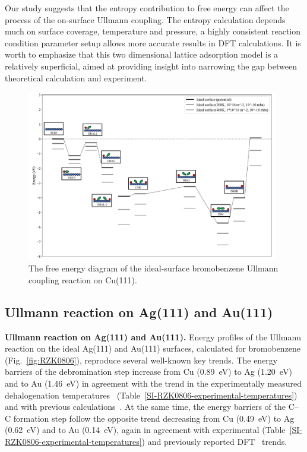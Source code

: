 \documentclass[journal=jacsat,manuscript=article]{achemso}
\begin{document}
{Our study suggests that the entropy contribution to free energy can affect the process of the on-surface Ullmann coupling. The entropy calculation depends much on surface coverage, temperature and pressure, a highly consistent reaction condition parameter setup allows more accurate results in DFT calculations. It is worth to emphasize that this two dimensional lattice adsorption model is a relatively superficial, aimed at providing insight into narrowing the gap between theoretical calculation and experiment. 
}

\begin{figure}[hbt]
\centering
\includegraphics[width=0.98\textwidth]{Fig/entropy-correction.pdf}
\caption{The free energy diagram of the ideal-surface bromobenzene Ullmann coupling reaction on Cu(111).}
\label{fig:entropy}
\end{figure}

\fi

\ifdefined\INTERNAL
\subsection{Ullmann reaction on Ag(111) and Au(111)}
\fi


\textbf{Ullmann reaction on Ag(111) and Au(111).}
%
Energy profiles of the Ullmann reaction on the ideal Ag(111) and Au(111) surfaces, calculated for bromobenzene (Fig.~\ref{fig:RZK0806}), reproduce several well-known key trends.  
%
The energy barriers of the debromination step increase from Cu (\SI{0.89}{\electronvolt}) to Ag (\SI{1.20}{\electronvolt}) and to Au (\SI{1.46}{\electronvolt}) in agreement with the trend in the experimentally measured dehalogenation temperatures~\cite{ullmann_52,ullmann_87,ullmann_67} (Table~\ref{SI-RZK0806-experimental-temperatures}) and with previous calculations~\cite{RZK0806}.
%
At the same time, the energy barriers of the C--C formation step follow the opposite trend decreasing from Cu (\SI{0.49}{\electronvolt}) to Ag (\SI{0.62}{\electronvolt}) and to Au (\SI{0.14}{\electronvolt}), again in agreement with experimental (Table~\ref{SI-RZK0806-experimental-temperatures}) and previously reported DFT~\cite{RZK0806} trends.
\end{document}
